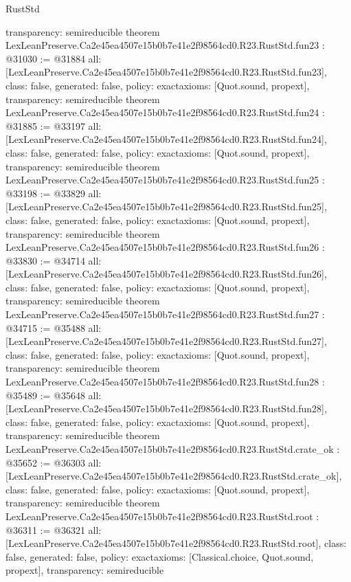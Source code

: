 \begin{lexlean}{RustStd}
\begin{coremodule}
{  transparency: semireducible
}
theorem LexLeanPreserve.Ca2e45ea4507e15b0b7e41e2f98564cd0.R23.RustStd.fun23 : @31030 := @31884 {
  all: [LexLeanPreserve.Ca2e45ea4507e15b0b7e41e2f98564cd0.R23.RustStd.fun23],
  class: false,
  generated: false,
  policy: exact{axioms: [Quot.sound, propext]},
  transparency: semireducible
}
theorem LexLeanPreserve.Ca2e45ea4507e15b0b7e41e2f98564cd0.R23.RustStd.fun24 : @31885 := @33197 {
  all: [LexLeanPreserve.Ca2e45ea4507e15b0b7e41e2f98564cd0.R23.RustStd.fun24],
  class: false,
  generated: false,
  policy: exact{axioms: [Quot.sound, propext]},
  transparency: semireducible
}
theorem LexLeanPreserve.Ca2e45ea4507e15b0b7e41e2f98564cd0.R23.RustStd.fun25 : @33198 := @33829 {
  all: [LexLeanPreserve.Ca2e45ea4507e15b0b7e41e2f98564cd0.R23.RustStd.fun25],
  class: false,
  generated: false,
  policy: exact{axioms: [Quot.sound, propext]},
  transparency: semireducible
}
theorem LexLeanPreserve.Ca2e45ea4507e15b0b7e41e2f98564cd0.R23.RustStd.fun26 : @33830 := @34714 {
  all: [LexLeanPreserve.Ca2e45ea4507e15b0b7e41e2f98564cd0.R23.RustStd.fun26],
  class: false,
  generated: false,
  policy: exact{axioms: [Quot.sound, propext]},
  transparency: semireducible
}
theorem LexLeanPreserve.Ca2e45ea4507e15b0b7e41e2f98564cd0.R23.RustStd.fun27 : @34715 := @35488 {
  all: [LexLeanPreserve.Ca2e45ea4507e15b0b7e41e2f98564cd0.R23.RustStd.fun27],
  class: false,
  generated: false,
  policy: exact{axioms: [Quot.sound, propext]},
  transparency: semireducible
}
theorem LexLeanPreserve.Ca2e45ea4507e15b0b7e41e2f98564cd0.R23.RustStd.fun28 : @35489 := @35648 {
  all: [LexLeanPreserve.Ca2e45ea4507e15b0b7e41e2f98564cd0.R23.RustStd.fun28],
  class: false,
  generated: false,
  policy: exact{axioms: [Quot.sound, propext]},
  transparency: semireducible
}
theorem LexLeanPreserve.Ca2e45ea4507e15b0b7e41e2f98564cd0.R23.RustStd.crate_ok : @35652 := @36303 {
  all: [LexLeanPreserve.Ca2e45ea4507e15b0b7e41e2f98564cd0.R23.RustStd.crate_ok],
  class: false,
  generated: false,
  policy: exact{axioms: [Quot.sound, propext]},
  transparency: semireducible
}
theorem LexLeanPreserve.Ca2e45ea4507e15b0b7e41e2f98564cd0.R23.RustStd.root : @36311 := @36321 {
  all: [LexLeanPreserve.Ca2e45ea4507e15b0b7e41e2f98564cd0.R23.RustStd.root],
  class: false,
  generated: false,
  policy: exact{axioms: [Classical.choice, Quot.sound, propext]},
  transparency: semireducible
}


\end{coremodule}
\end{lexlean}
